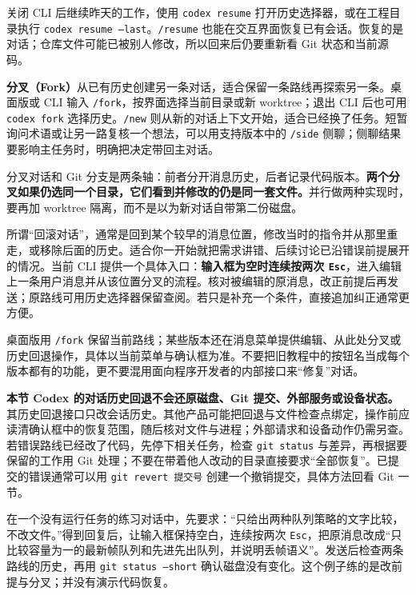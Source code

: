 关闭 CLI 后继续昨天的工作，使用 \texttt{codex resume} 打开历史选择器，或在工程目录执行 \texttt{codex resume --last}。\texttt{/resume} 也能在交互界面恢复已有会话。恢复的是对话；仓库文件可能已被别人修改，所以回来后仍要重新看 Git 状态和当前源码。

\textbf{分叉（Fork）}从已有历史创建另一条对话，适合保留一条路线再探索另一条。桌面版或 CLI 输入 \texttt{/fork}，按界面选择当前目录或新 worktree；退出 CLI 后也可用 \texttt{codex fork} 选择历史。\texttt{/new} 则从新的对话上下文开始，适合已经换了任务。短暂询问术语或让另一路复核一个想法，可以用支持版本中的 \texttt{/side} 侧聊；侧聊结果要影响主任务时，明确把决定带回主对话。

分叉对话和 Git 分支是两条轴：前者分开消息历史，后者记录代码版本。\textbf{两个分叉如果仍选同一个目录，它们看到并修改的仍是同一套文件。}并行做两种实现时，要再加 worktree 隔离，而不是以为新对话自带第二份磁盘。

所谓“回滚对话”，通常是回到某个较早的消息位置，修改当时的指令并从那里重走，或移除后面的历史。适合你一开始就把需求讲错、后续讨论已沿错误前提展开的情况。当前 CLI 提供一个具体入口：\textbf{输入框为空时连续按两次 \texttt{Esc}}，进入编辑上一条用户消息并从该位置分叉的流程。核对被编辑的原消息，改正前提后再发送；原路线可用历史选择器保留查阅。若只是补充一个条件，直接追加纠正通常更方便。

桌面版用 \texttt{/fork} 保留当前路线；某些版本还在消息菜单提供编辑、从此处分叉或历史回退操作，具体以当前菜单与确认框为准。不要把旧教程中的按钮名当成每个版本都有的功能，更不要混用面向程序开发者的内部接口来“修复”对话。

\begin{note}
\textbf{本节 Codex 的对话历史回退不会还原磁盘、Git 提交、外部服务或设备状态。}其历史回退接口只改会话历史。其他产品可能把回退与文件检查点绑定，操作前应读清确认框中的恢复范围，随后核对文件与进程；外部请求和设备动作仍需另查。若错误路线已经改了代码，先停下相关任务，检查 \texttt{git status} 与差异，再根据要保留的工作用 Git 处理；不要在带着他人改动的目录直接要求“全部恢复”。已提交的错误通常可以用 \texttt{git revert 提交号} 创建一个撤销提交，具体方法回看 Git 一节。
\end{note}

\begin{example}
在一个没有运行任务的练习对话中，先要求：“只给出两种队列策略的文字比较，不改文件。”得到回复后，让输入框保持空白，连续按两次 \texttt{Esc}，把原消息改成“只比较容量为一的最新帧队列和先进先出队列，并说明丢帧语义”。发送后检查两条路线的历史，再用 \texttt{git status --short} 确认磁盘没有变化。这个例子练的是改前提与分叉；并没有演示代码恢复。
\end{example}

